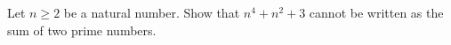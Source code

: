 Let $n\ge2$ be a natural number. Show that $n^4+n^2+3$ cannot be written as the sum of two prime numbers.
